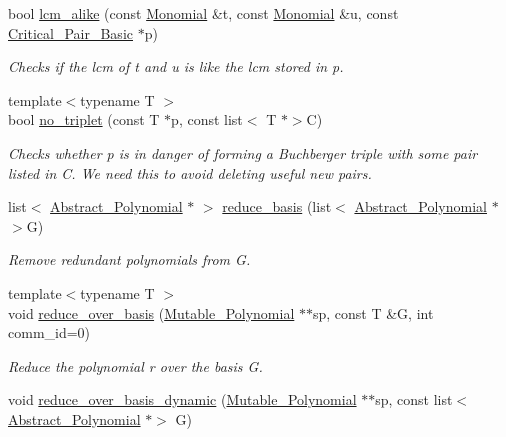\begin{DoxyCompactItemize}
\item 
bool \hyperlink{group___g_b_computation_gaa94e7defe45b81c6e80138df0637c0dd}{lcm\+\_\+alike} (const \hyperlink{group__polygroup_class_monomial}{Monomial} \&t, const \hyperlink{group__polygroup_class_monomial}{Monomial} \&u, const \hyperlink{group___g_b_computation_class_critical___pair___basic}{Critical\+\_\+\+Pair\+\_\+\+Basic} $\ast$p)
\begin{DoxyCompactList}\small\item\em Checks if the lcm of {\ttfamily t} and {\ttfamily u} is like the lcm stored in {\ttfamily p}. \end{DoxyCompactList}\item 
{\footnotesize template$<$typename T $>$ }\\bool \hyperlink{group___g_b_computation_ga8ea11a89240d420c46bcad752aeb0f6a}{no\+\_\+triplet} (const T $\ast$p, const list$<$ T $\ast$$>$C)
\begin{DoxyCompactList}\small\item\em Checks whether {\ttfamily p} is in danger of forming a Buchberger triple with some pair listed in {\ttfamily C}. We need this to avoid deleting useful new pairs. \end{DoxyCompactList}\item 
list$<$ \hyperlink{group__polygroup_class_abstract___polynomial}{Abstract\+\_\+\+Polynomial} $\ast$ $>$ \hyperlink{group___g_b_computation_gaf4fe293e7cdc8ec2fd8b13df3318cb4a}{reduce\+\_\+basis} (list$<$ \hyperlink{group__polygroup_class_abstract___polynomial}{Abstract\+\_\+\+Polynomial} $\ast$$>$G)
\begin{DoxyCompactList}\small\item\em Remove redundant polynomials from {\ttfamily G}. \end{DoxyCompactList}\item 
{\footnotesize template$<$typename T $>$ }\\void \hyperlink{group___g_b_computation_ga4510be23ab1030c63d493542157141bd}{reduce\+\_\+over\+\_\+basis} (\hyperlink{group__polygroup_class_mutable___polynomial}{Mutable\+\_\+\+Polynomial} $\ast$$\ast$sp, const T \&G, int comm\+\_\+id=0)
\begin{DoxyCompactList}\small\item\em Reduce the polynomial r over the basis G. \end{DoxyCompactList}\item 
void \hyperlink{group___g_b_computation_gacc7cc5e063ab751ac50cc8c7009d3dbd}{reduce\+\_\+over\+\_\+basis\+\_\+dynamic} (\hyperlink{group__polygroup_class_mutable___polynomial}{Mutable\+\_\+\+Polynomial} $\ast$$\ast$sp, const list$<$ \hyperlink{group__polygroup_class_abstract___polynomial}{Abstract\+\_\+\+Polynomial} $\ast$$>$ G)
$$
\end{DoxyCompactItemize}

